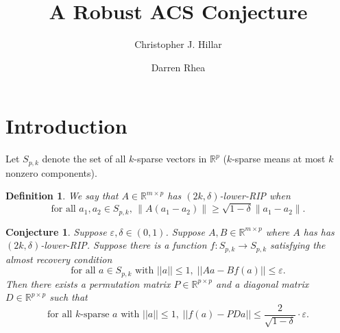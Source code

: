\documentclass[11pt]{amsart}
\title[A Robust ACS Conjecture]{A Robust ACS Conjecture}
\author[C.J. Hillar]{Christopher J. Hillar}
\author[D. Rhea]{Darren Rhea}
\newtheorem{conjecture}{Conjecture}
\newtheorem{definition}{Definition}
\begin{document}
\maketitle

\section{Introduction}

Let $S_{p,k}$ denote the set of all $k$-sparse vectors in $\mathbb R^p$ ($k$-sparse means at most $k$ nonzero components).

\begin{definition}
We say that $A\in  \mathbb R^{m \times p}$  has $(2k,\delta)$-lower-RIP when
\begin{equation}\label{ACShyp1}
\text{for all $a_1,a_2 \in S_{p,k}$, } \|A(a_1 - a_2)\| \geq  \sqrt{1-\delta} \|a_1-a_2\|.
\end{equation}
\end{definition}

\begin{conjecture}\label{robustACSconj}
Suppose $\varepsilon, \delta \in (0,1)$. Suppose $A,B \in \mathbb R^{m \times p}$ where $A$ has has $(2k,\delta)$-lower-RIP.  
Suppose there is a function $f: S_{p,k} \to S_{p,k}$ satisfying 
the almost recovery condition
\begin{equation}\label{ACShyp2}
\text{for all $a\in S_{p,k}$ with $||a|| \leq 1$,} \ \ ||Aa - Bf(a)|| \leq \varepsilon .
\end{equation}
Then there exists a permutation matrix $P \in \mathbb R^{p \times p}$ and a diagonal matrix $D  \in \mathbb R^{p \times p}$ such that 
\begin{equation}\label{ACShyp3}
\text{for all $k$-sparse $a$ with $||a|| \leq 1$,} \ \ ||f(a) - PDa || \leq \frac{ 2}{\sqrt{1-\delta}} \cdot  \varepsilon .
\end{equation}
\end{conjecture}
\end{document}
